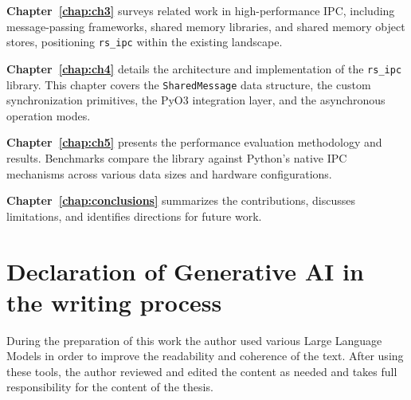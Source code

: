 \textbf{Chapter~\ref{chap:ch3}} surveys related work in high-performance IPC, including message-passing frameworks, shared memory libraries, and shared memory object stores, positioning \texttt{rs\_ipc} within the existing landscape.

\textbf{Chapter~\ref{chap:ch4}} details the architecture and implementation of the \texttt{rs\_ipc} library. This chapter covers the \texttt{SharedMessage} data structure, the custom synchronization primitives, the PyO3 integration layer, and the asynchronous operation modes.

\textbf{Chapter~\ref{chap:ch5}} presents the performance evaluation methodology and results. Benchmarks compare the library against Python's native IPC mechanisms across various data sizes and hardware configurations.

\textbf{Chapter~\ref{chap:conclusions}} summarizes the contributions, discusses limitations, and identifies directions for future work.

\section{Declaration of Generative AI in the writing process}
During the preparation of this work the author used various Large Language Models in order to improve the readability and coherence of the text.
After using these tools, the author reviewed and edited the content as needed and takes full responsibility for the content of the thesis.
